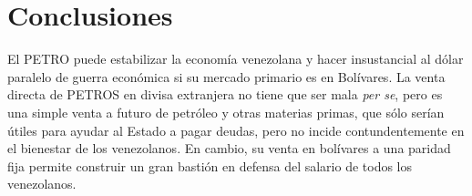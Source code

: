%
\section{Conclusiones}
\label{sec:conclu}
%
El PETRO puede estabilizar la economía venezolana y hacer insustancial al dólar paralelo de guerra económica si su mercado primario es en Bolívares. La venta directa de PETROS en divisa extranjera no tiene que ser mala \emph{per se}, pero es una simple venta a futuro de petróleo y otras materias primas, que sólo serían útiles para ayudar al Estado a pagar deudas, pero no incide contundentemente en el bienestar de los venezolanos. En cambio, su venta en bolívares a una paridad fija permite construir un gran bastión en defensa del salario de todos los venezolanos.